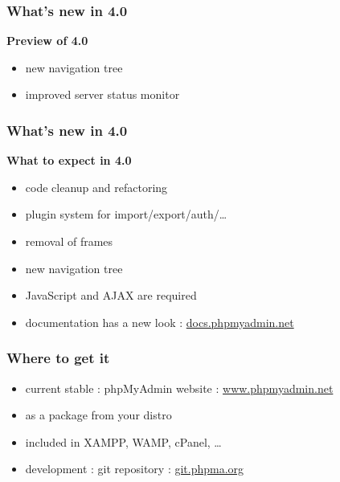 \documentclass[14pt]{beamer}
\begin{document}
  \begin{frame}
    \frametitle{What's new in 4.0}
    \textbf{{\color{PmaOlive}Preview of 4.0}}
     \begin{itemize}
      \item new navigation tree
      \item improved server status monitor
    \end{itemize}
  \end{frame}
  \begin{frame}
    \frametitle{What's new in 4.0}
    \textbf{{\color{PmaOlive}What to expect in 4.0}}
    \begin{itemize}
      \item code cleanup and refactoring
      \item plugin system for import/export/auth/\ldots
      \item removal of frames
      \item new navigation tree
      \pause
      \item JavaScript and AJAX are required
      \pause
      \item documentation has a new look : \href{https://docs.phpmyadmin.net/}{docs.phpmyadmin.net}
    \end{itemize}
  \end{frame}
  \begin{frame}
    \frametitle{Where to get it}
    \begin{itemize}[<+->]
      \item current stable : phpMyAdmin website : \href{http://www.phpmyadmin.net/}{www.phpmyadmin.net}
      \item as a package from your distro
      \item included in XAMPP, WAMP, cPanel, \ldots
      \item development : git repository :  \href{http://git.phpma.org/}{git.phpma.org}
    \end{itemize}
  \end{frame}
\end{document}
